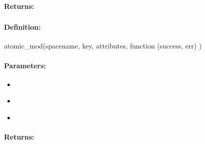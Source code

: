 \paragraph{Returns:}


\pagebreak
\subsubsection{}
\label{api:nodejs:atomic_mod}


\paragraph{Definition:}
\begin{javascriptcode}
atomic_mod(spacename, key, attributes, function (success, err) {})
\end{javascriptcode}
\paragraph{Parameters:}
\begin{itemize}[noitemsep]
\item {}\\

\item {}\\

\item {}\\

\end{itemize}

\paragraph{Returns:}


\pagebreak
\subsubsection{}
\label{api:nodejs:cond_atomic_mod}


